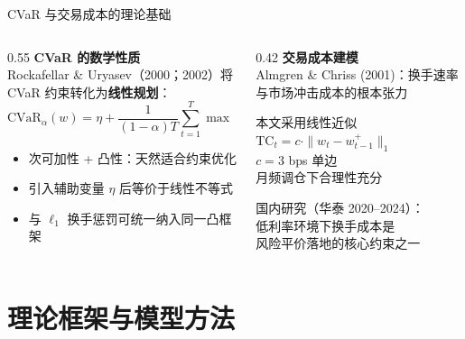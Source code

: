 \documentclass[aspectratio=169,11pt]{beamer}
\newcommand{\txCostBps}{3}
\begin{document}
\begin{frame}{CVaR 与交易成本的理论基础}
  \begin{columns}[T]
    \begin{column}{0.55\textwidth}
      \textbf{CVaR 的数学性质}\\[0.3em]
      Rockafellar \& Uryasev（2000；2002）将 CVaR 约束转化为\textbf{线性规划}：
      \[
        \mathrm{CVaR}_\alpha(w) = \eta + \frac{1}{(1-\alpha)T}\sum_{t=1}^T \max(-r_t^\top w - \eta,\, 0)
      \]
      \begin{itemize}
        \item 次可加性 + 凸性：天然适合约束优化
        \item 引入辅助变量 $\eta$ 后等价于线性不等式
        \item 与 $\ell_1$ 换手惩罚可统一纳入同一凸框架
      \end{itemize}
    \end{column}
    \begin{column}{0.42\textwidth}
      \textbf{交易成本建模}\\[0.3em]
      Almgren \& Chriss (2001)：换手速率与市场冲击成本的根本张力
      \vspace{0.5em}
      \begin{block}{本文采用线性近似}
        \centering
        $\mathrm{TC}_t = c \cdot \|w_t - w_{t-1}^+\|_1$\\[0.3em]
        \small $c = \txCostBps$ bps 单边\\
        月频调仓下合理性充分
      \end{block}
      \vspace{0.5em}
      \small 国内研究（华泰 2020--2024）：\\
      低利率环境下换手成本是\\
      风险平价落地的核心约束之一
    \end{column}
  \end{columns}
\end{frame}

\section{理论框架与模型方法}
\end{document}
